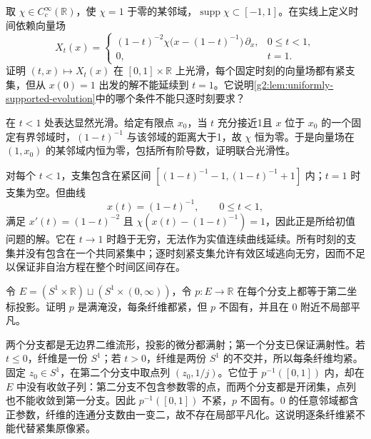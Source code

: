 \begin{exercise}\label{g2:ex:moving-compact-support-escape}
	取 \(\chi\in C_c^\infty(\mathbb R)\)，使 \(\chi=1\) 于零的某邻域，\(\operatorname{supp}\chi\subset[-1,1]\)。在实线上定义时间依赖向量场
	\[
		X_t(x)=\begin{cases}
			(1-t)^{-2}\chi\bigl(x-(1-t)^{-1}\bigr)\,\partial_x,&0\le t<1,\\
			0,&t=1.
		\end{cases}
	\]
	证明 \((t,x)\mapsto X_t(x)\) 在 \([0,1]\times\mathbb R\) 上光滑，每个固定时刻的向量场都有紧支集，但从 \(x(0)=1\) 出发的解不能延续到 \(t=1\)。它说明\cref{g2:lem:uniformly-supported-evolution}中的哪个条件不能只逐时刻要求？
\end{exercise}
\begin{solution}
	在 \(t<1\) 处表达显然光滑。给定有限点 \(x_0\)，当 \(t\) 充分接近1且 \(x\) 位于 \(x_0\) 的一个固定有界邻域时，\((1-t)^{-1}\) 与该邻域的距离大于1，故 \(\chi\) 恒为零。于是向量场在 \((1,x_0)\) 的某邻域内恒为零，包括所有阶导数，证明联合光滑性。

	对每个 \(t<1\)，支集包含在紧区间 \([(1-t)^{-1}-1,(1-t)^{-1}+1]\) 内；\(t=1\) 时支集为空。但曲线
	\[
		x(t)=(1-t)^{-1},\qquad0\le t<1,
	\]
	满足 \(x'(t)=(1-t)^{-2}\) 且 \(\chi(x(t)-(1-t)^{-1})=1\)，因此正是所给初值问题的解。它在 \(t\to1\) 时趋于无穷，无法作为实值连续曲线延续。所有时刻的支集并没有包含在一个共同紧集中；逐时刻紧支集允许有效区域逃向无穷，因而不足以保证非自治方程在整个时间区间存在。
\end{solution}

\begin{exercise}\label{g2:ex:compact-fibers-not-proper}
	令 \(E=(S^1\times\mathbb R)\sqcup(S^1\times(0,\infty))\)，令 \(p:E\to\mathbb R\) 在每个分支上都等于第二坐标投影。证明 \(p\) 是满淹没，每条纤维都紧，但 \(p\) 不固有，并且在 \(0\) 附近不局部平凡。
\end{exercise}
\begin{solution}
	两个分支都是无边界二维流形，投影的微分都满射；第一个分支已保证满射性。若 \(t\leq0\)，纤维是一份 \(S^1\)；若 \(t>0\)，纤维是两份 \(S^1\) 的不交并，所以每条纤维均紧。固定 \(z_0\in S^1\)，在第二个分支中取点列 \((z_0,1/j)\)。它位于 \(p^{-1}([0,1])\) 内，却在 \(E\) 中没有收敛子列：第二分支不包含参数零的点，而两个分支都是开闭集，点列也不能收敛到第一分支。因此 \(p^{-1}([0,1])\) 不紧，\(p\) 不固有。\(0\) 的任意邻域都含正参数，纤维的连通分支数由一变二，故不存在局部平凡化。这说明逐条纤维紧不能代替紧集原像紧。
\end{solution}

